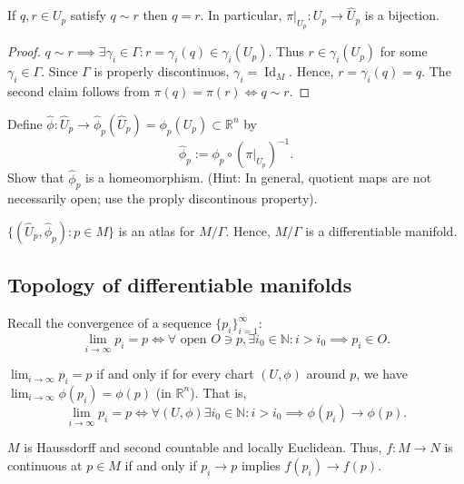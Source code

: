 \begin{lemma}
If $q, r \in U_p$ satisfy $q \sim r$ then $q = r$. In particular, $\pi|_{U_p}: U_p \to \hat{U}_p$ is a
bijection.
\end{lemma}

\begin{proof}
$q \sim r \implies \exists \gamma_i \in \Gamma : r = \gamma_i(q) \in \gamma_i(U_p)$.
Thus $r \in \gamma_i(U_p)$ for some $\gamma_i \in \Gamma$.
Since $\Gamma$ is properly discontinuos, $\gamma_i = \operatorname{Id}_M$.
Hence, $r = \gamma_i(q) = q$. The second claim follows from $\pi(q) = \pi(r) \iff q \sim r$.
\end{proof}

\begin{problem}
Define $\hat{\phi}:\hat{U}_p \to \hat{\phi}_p(\hat{U}_p) = \phi_p(U_p) \subset \mathbb{R}^n$ by
\[\hat{\phi}_p := \phi_p \circ (\pi|_{U_p})^{-1}.\]
Show that $\hat{\phi}_p$ is a homeomorphism.
(Hint: In general, quotient maps are not necessarily open; use the proply discontinous property).
\end{problem}

\begin{theorem}
$\{(\hat{U}_p, \hat{\phi}_p) : p \in M\}$ is an atlas for $M/\Gamma$. Hence, $M/\Gamma$ is a differentiable manifold.
\end{theorem}

\subsection{Topology of differentiable manifolds}

Recall the convergence of a sequence $\{p_i\}_{i=1}^{\infty}$:
\[\lim_{i\to \infty} p_i = p \iff \forall \text{ open } O \ni p, \exists i_0 \in \mathbb{N} : i > i_0 \implies p_i \in O.\]

\begin{proposition}
$\lim_{i\to\infty} p_i = p$ if and only if for every chart $(U, \phi)$ around $p$, we have $\lim_{i\to\infty} \phi(p_i) = \phi(p)$ (in $\mathbb{R}^n$).
That is, 
\[\lim_{i\to\infty} p_i = p \iff \forall (U, \phi) \exists i_0 \in \mathbb{N} : i > i_0 \implies \phi(p_i) \to \phi(p).\]
\end{proposition}

\begin{remark}
$M$ is Haussdorff and second countable and locally Euclidean. 
Thus, $f: M \to N$ is continuous at $p \in M$ if and only if $p_i \to p$ implies $f(p_i) \to f(p)$.
\end{remark}


